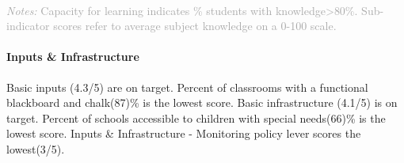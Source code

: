 \documentclass[twocolumn]{article}
\let\oldparagraph\paragraph
\renewcommand{\paragraph}[1]{\oldparagraph{#1}\mbox{}}
\begin{document}
\begin{table}[H]
\\
{\scriptsize
    \textcolor{darkgray}{\textit{Notes:} Capacity for learning indicates \% students with knowledge\textgreater{80\%}. Sub-indicator scores refer to average subject knowledge on a 0-100 scale.}
  }

\end{table}
\raggedbottom

\hypertarget{inputs-infrastructure}{%
\paragraph{\texorpdfstring{\textbf{Inputs \&
Infrastructure}}{Inputs \& Infrastructure}}\label{inputs-infrastructure}}

Basic inputs (4.3/5) are on target. Percent of classrooms with a
functional blackboard and chalk(87)\% is the lowest score. Basic
infrastructure (4.1/5) is on target. Percent of schools accessible to
children with special needs(66)\% is the lowest score. Inputs \&
Infrastructure - Monitoring policy lever scores the lowest(3/5).
\end{document}
